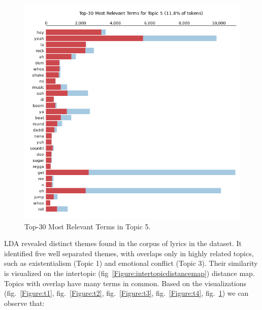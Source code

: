 \begin{center}
\begin{figure}[H]
  \centering
  \includegraphics[width=6in]{img/topics/png/t5.png}
  \caption{Top-30 Most Relevant Terms in Topic 5.}
  \label{Figure:t5}
\end{figure}
\end{center}

LDA revealed distinct themes found in the corpus of  lyrics in the dataset. It
identified five well separated themes, with overlaps only in highly related
topics, such as existentialism (Topic 1) and emotional conflict (Topic 3).
Their similarity is visualized on the intertopic
(fig~\ref{Figure:intertopicdistancemap}) distance map. Topics with overlap have
many terms in common. Based on the visualizations (fig.~\ref{Figure:t1},
fig.~\ref{Figure:t2}, fig.~\ref{Figure:t3}, fig.~\ref{Figure:t4},
fig.~\ref{Figure:t5}) we can observe that:

